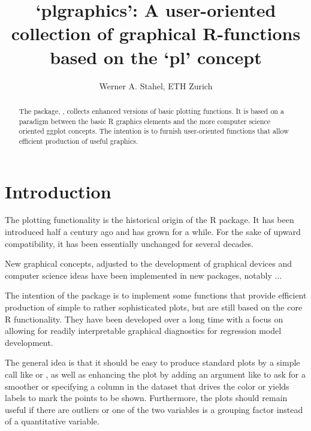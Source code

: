 \documentclass[11pt]{article}
\begin{document}
\baselineskip 15pt
\parskip 10pt

\title{\vspace*{-10mm}
`plgraphics': A user-oriented collection of graphical R-functions based on
 the `pl' concept}
\author{Werner A. Stahel, ETH Zurich}
\maketitle

\begin{abstract}\noindent
The package, , collects enhanced versions of basic plotting
functions. It is based on a paradigm between the basic R graphics elements
and the more computer science oriented ggplot concepts.
The intention is to furnish user-oriented functions that allow efficient
production of useful graphics.
\end{abstract}


\tableofcontents

\pagebreak
\section{Introduction}

The plotting functionality is the historical origin of the R package.
It has been introduced half a century ago and has grown for a while.
For the sake of upward compatibility, it has been essentially unchanged for
several decades. 

New graphical concepts, adjusted to the development of graphical devices
and computer science ideas have been implemented in new packages, 
notably  ...

The intention of the package  is to implement some functions
that provide efficient production of simple to rather sophisticated plots,
but are still based on the core R functionality.
They have been developed over a long time with a focus on allowing 
for readily interpretable graphical diagnostics for regression model
development. 

The general idea is that it should be easy to produce standard plots 
by a simple call like  or , 
as well as enhancing the plot by adding an argument like  
to ask for a smoother or specifying 
a column in the dataset that drives the color or yields labels to mark the
points to be shown. 
Furthermore, the plots should remain useful if there are outliers 
or one of the two
variables is a grouping factor instead of a quantitative variable.
\end{document}

